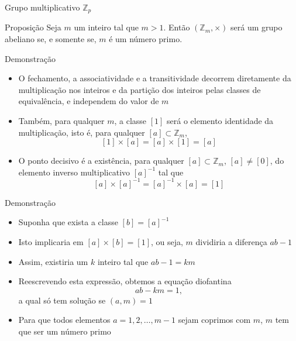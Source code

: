 \begin{frame}[fragile]{Grupo multiplicativo $\mathbb{Z}_p$}

    \begin{block}{Proposição}
        Seja $m$ um inteiro tal que $m > 1$. Então $(\mathbb{Z}_m, \times)$ será um grupo 
            abeliano se, e somente se, $m$ é um número primo.
    \end{block}

\end{frame}

\begin{frame}[fragile]{Demonstração}

    \begin{itemize}
        \item O fechamento, a associatividade e a transitividade decorrem diretamente da 
            multiplicação nos inteiros e da partição dos inteiros pelas classes de equivalência,
            e independem do valor de $m$

        \item Também, para qualquer $m$, a classe $[1]$ será o elemento identidade da 
            multiplicação, isto é, para qualquer $[a]\subset \mathbb{Z}_m$,
        $$
            [1]\times [a] = [a]\times [1] = [a]
        $$

        \item O ponto decisivo é a existência, para qualquer $[a]\subset \mathbb{Z}_m$, 
            $[a]\neq [0]$,  do elemento inverso multiplicativo $[a]^{-1}$ tal que
        $$
            [a]\times [a]^{-1} = [a]^{-1}\times [a] = [1]
        $$
    \end{itemize}

\end{frame}

\begin{frame}[fragile]{Demonstração}

    \begin{itemize}
        \item Suponha que exista a classe $[b] = [a]^{-1}$

        \item Isto implicaria em $[a]\times [b] = [1]$, ou seja, $m$ dividiria a diferença $ab - 1$ 

        \item Assim, existiria um $k$ inteiro tal que $ab - 1 = km$

        \item Reescrevendo esta expressão, obtemos a equação diofantina
        $$
            ab - km = 1,
        $$
        a qual só tem solução se $(a, m) = 1$

        \item Para que todos elementos $a = 1, 2, \ldots, m - 1$ sejam coprimos com $m$, $m$ tem que
            ser um número primo 
    \end{itemize}

\end{frame}

